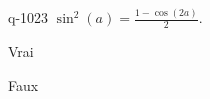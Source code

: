\begin{truefalse}{q-1023}
$\sin^2(a)=\frac{1-\cos(2a)}{2}$.
\item* Vrai
\item Faux
\end{truefalse}

